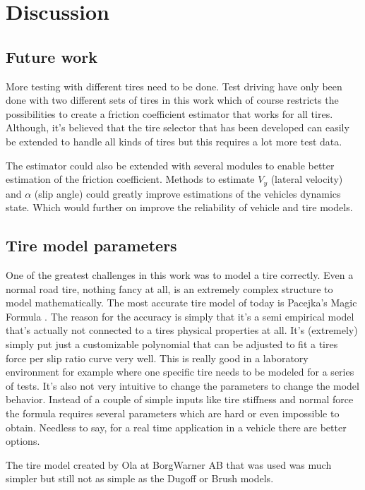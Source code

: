 \chapter{Discussion}

\section{Future work}
More testing with different tires need to be done. Test driving have only been done with two different sets of tires in this work which of course restricts the possibilities to create a friction coefficient estimator that works for all tires. Although, it's believed that the tire selector that has been developed can easily be extended to handle all kinds of tires but this requires a lot more test data.

The estimator could also be extended with several modules to enable better estimation of the friction coefficient. Methods to estimate $ V_{y} $ (lateral velocity) and $ \alpha $ (slip angle) could greatly improve estimations of the vehicles dynamics state. Which would further on improve the reliability of vehicle and tire models.

\section{Tire model parameters}
One of the greatest challenges in this work was to model a tire correctly. Even a normal road tire, nothing fancy at all, is an extremely complex structure to model mathematically. The most accurate tire model of today is Pacejka's Magic Formula \cite{pacejka}. The reason for the accuracy is simply that it's a semi empirical model that's actually not connected to a tires physical properties at all. It's (extremely) simply put just a customizable polynomial that can be adjusted to fit a tires force per slip ratio curve very well. This is really good in a laboratory environment for example where one specific tire needs to be modeled for a series of tests. It's also not very intuitive to change the parameters to change the model behavior. Instead of a couple of simple inputs like tire stiffness and normal force the formula requires several parameters which are hard or even impossible to obtain. Needless to say, for a real time application in a vehicle there are better options.

The tire model created by Ola at BorgWarner AB that was used was much simpler but still not as simple as the Dugoff or Brush models.  


